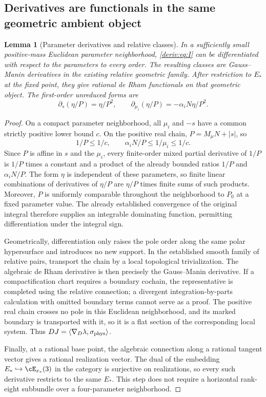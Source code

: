\documentclass[11pt,a4paper,oneside]{article}
\theoremstyle{plain}
\newtheorem{lemma}[theorem]{Lemma}
\theoremstyle{definition}
\theoremstyle{remark}
\numberwithin{equation}{section}
\begin{document}
\subsection{Derivatives are functionals in the same geometric ambient object}
\begin{lemma}[Parameter derivatives and relative classes]\label{deriv:lem:actual}
In a sufficiently small positive-mass Euclidean parameter neighborhood, \eqref{deriv:eq:I} can be differentiated with respect to the parameters to every order.
The resulting classes are Gauss--Manin derivatives in the existing relative geometric family. After restriction to $E_*$ at the fixed point, they give rational de Rham functionals on that geometric object.
The first-order unreduced forms are
\begin{equation}\label{deriv:eq:derforms}
 \partial_s(\eta/P)=\eta/P^2,\qquad
 \partial_{\mu_i}(\eta/P)=-\alpha_iN\eta/P^2.
\end{equation}
\end{lemma}
\begin{proof}
On a compact parameter neighborhood, all $\mu_i$ and $-s$ have a common strictly positive lower bound $c$.
On the positive real chain, $P=M_\mu N+|s|$, so
\[
 1/P\le 1/c,\qquad \alpha_iN/P\le1/\mu_i\le1/c.
\]
Since $P$ is affine in $s$ and the $\mu_i$, every finite-order mixed partial derivative of $1/P$ is $1/P$ times a constant and a product of the already bounded ratios $1/P$ and $\alpha_iN/P$.
The form $\eta$ is independent of these parameters, so finite linear combinations of derivatives of $\eta/P$ are $\eta/P$ times finite sums of such products.
Moreover, $P$ is uniformly comparable throughout the neighborhood to $P_0$ at a fixed parameter value.
The already established convergence of the original integral therefore supplies an integrable dominating function, permitting differentiation under the integral sign.

Geometrically, differentiation only raises the pole order along the same polar hypersurface and introduces no new support.
In the established smooth family of relative pairs, transport the chain by a local topological trivialization. The algebraic de Rham derivative is then precisely the Gauss--Manin derivative.
If a compactification chart requires a boundary cochain, the representative is completed using the relative connection; a divergent integration-by-parts calculation with omitted boundary terms cannot serve as a proof.
The positive real chain crosses no pole in this Euclidean neighborhood, and its marked boundary is transported with it, so it is a flat section of the corresponding local system.
Thus $D J=\langle\nabla_D\lambda,\sigma_{\rm phys}\rangle$.

Finally, at a rational base point, the algebraic connection along a rational tangent vector gives a rational realization vector.
The dual of the embedding $E_*\hookrightarrow\cE_{x_*}(3)$ in the category is surjective on realizations, so every such derivative restricts to the same $E_*$.
This step does not require a horizontal rank-eight subbundle over a four-parameter neighborhood.
\end{proof}
\end{document}
